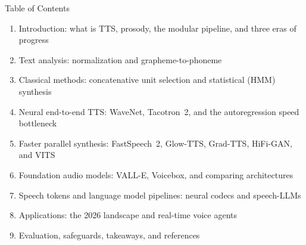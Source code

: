 \begin{frame}{Table of Contents}
  \begin{enumerate}
    \item Introduction: what is TTS, prosody, the modular pipeline, and three eras of progress
    \item Text analysis: normalization and grapheme-to-phoneme
    \item Classical methods: concatenative unit selection and statistical (HMM) synthesis
    \item Neural end-to-end TTS: WaveNet, Tacotron~2, and the autoregression speed bottleneck
    \item Faster parallel synthesis: FastSpeech~2, Glow-TTS, Grad-TTS, HiFi-GAN, and VITS
    \item Foundation audio models: VALL-E, Voicebox, and comparing architectures
    \item Speech tokens and language model pipelines: neural codecs and speech-LLMs
    \item Applications: the 2026 landscape and real-time voice agents
    \item Evaluation, safeguards, takeaways, and references
  \end{enumerate}
\end{frame}
